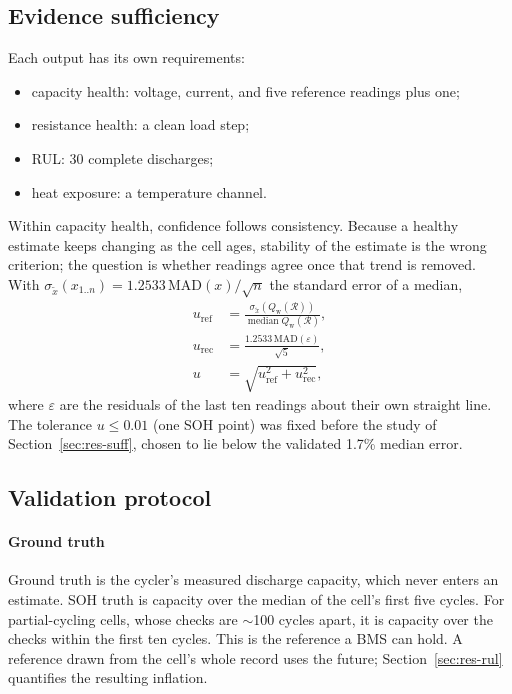 \documentclass[preprint,12pt,authoryear]{elsarticle}
\newcommand{\Qw}{Q_{\mathrm{w}}}
\begin{document}
\subsection{Evidence sufficiency}
Each output has its own requirements:
\begin{itemize}
\item capacity health: voltage, current, and five reference readings plus one;
\item resistance health: a clean load step;
\item RUL: 30 complete discharges;
\item heat exposure: a temperature channel.
\end{itemize}
Within capacity health, confidence follows consistency. Because a healthy
estimate keeps changing as the cell ages, stability of the estimate is the
wrong criterion; the question is whether readings agree once that trend is
removed. With $\sigma_{\tilde x}(x_{1..n}) = 1.2533\,\mathrm{MAD}(x)/\sqrt{n}$
the standard error of a median,
\begin{align}
u_\mathrm{ref} &= \frac{\sigma_{\tilde x}\!\left(\Qw(\mathcal{R})\right)}{\operatorname{median}\Qw(\mathcal{R})}, \\
u_\mathrm{rec} &= \frac{1.2533\,\mathrm{MAD}(\varepsilon)}{\sqrt{5}}, \\
u &= \sqrt{u_\mathrm{ref}^2 + u_\mathrm{rec}^2},
\label{eq:u}
\end{align}
where $\varepsilon$ are the residuals of the last ten readings about their own
straight line. The tolerance $u \le 0.01$ (one SOH point) was fixed before the
study of Section~\ref{sec:res-suff}, chosen to lie below the validated 1.7\%
median error.

\subsection{Validation protocol}
\paragraph{Ground truth}
Ground truth is the cycler's measured discharge capacity, which never enters
an estimate. SOH truth is capacity over the median of the cell's first five
cycles. For partial-cycling cells, whose checks are ${\sim}$100 cycles apart, it
is capacity over the checks within the first ten cycles. This is the reference a
BMS can hold. A reference drawn from the cell's whole record uses the future;
Section~\ref{sec:res-rul} quantifies the resulting inflation.
\end{document}
